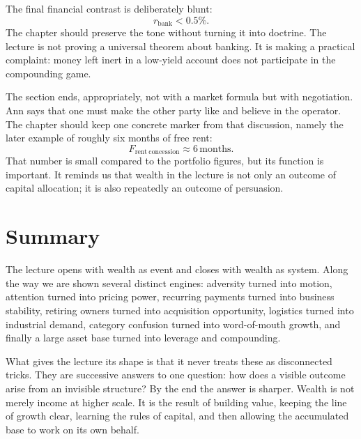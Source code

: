 The final financial contrast is deliberately blunt:
\begin{equation}
r_{\mathrm{bank}} < 0.5\%.
\end{equation}
The chapter should preserve the tone without turning it into doctrine. The lecture is not proving a universal theorem about banking. It is making a practical complaint: money left inert in a low-yield account does not participate in the compounding game.

The section ends, appropriately, not with a market formula but with negotiation. Ann says that one must make the other party like and believe in the operator. The chapter should keep one concrete marker from that discussion, namely the later example of roughly six months of free rent:
\begin{equation}
F_{\mathrm{rent\ concession}} \approx 6\,\mathrm{months}.
\end{equation}
That number is small compared to the portfolio figures, but its function is important. It reminds us that wealth in the lecture is not only an outcome of capital allocation; it is also repeatedly an outcome of persuasion.

\section{Summary}

The lecture opens with wealth as event and closes with wealth as system. Along the way we are shown several distinct engines: adversity turned into motion, attention turned into pricing power, recurring payments turned into business stability, retiring owners turned into acquisition opportunity, logistics turned into industrial demand, category confusion turned into word-of-mouth growth, and finally a large asset base turned into leverage and compounding.

What gives the lecture its shape is that it never treats these as disconnected tricks. They are successive answers to one question: how does a visible outcome arise from an invisible structure? By the end the answer is sharper. Wealth is not merely income at higher scale. It is the result of building value, keeping the line of growth clear, learning the rules of capital, and then allowing the accumulated base to work on its own behalf.